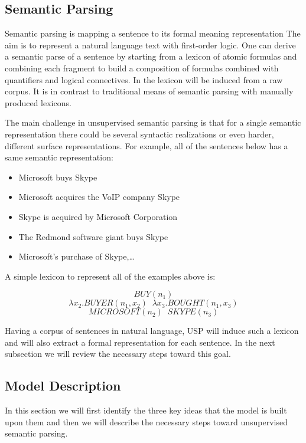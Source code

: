 \documentclass[12pt]{report}
\begin{document}
\subsection{Semantic Parsing}
\label{ch:definition}

Semantic parsing is mapping a sentence to its formal meaning representation \cite{Poon2009}
The aim is to represent a natural language text with first-order logic. One can derive a semantic parse of a sentence
by starting from a lexicon of atomic formulas and combining each fragment to build a composition of 
formulas combined with quantifiers and logical connectives. In \cite{Poon2009} 
the lexicon will be induced from a raw corpus. It is in contrast to traditional means of semantic parsing with manually
  produced lexicons.
  
  The main challenge in unsupervised semantic parsing is that for a single semantic representation there could be
  several syntactic realizations or even harder, different surface representations. For example, all of the
   sentences below has a same semantic representation:
   \begin{itemize}
     \item Microsoft buys Skype
     \item Microsoft acquires the VoIP company Skype
     \item Skype is acquired by Microsoft Corporation
     \item The Redmond software giant buys Skype
     \item Microsoft’s purchase of Skype,\ldots
   \end{itemize}  
  
   A simple lexicon to represent all of the examples above is:
  
   $$ BUY(n_1)$$
   $$ \lambda x_2.BUYER(n_1 , x_2) \; \;  \lambda x_3.BOUGHT(n_1 , x_3) $$
   $$ MICROSOFT(n_2) \; \; SKYPE(n_3)$$
   
   Having a corpus of sentences in natural language, USP \cite{Poon2009}
    will induce such a lexicon and will also extract a formal representation for each sentence. In the next 
    subsection we will review the necessary steps toward this goal.
\subsection{Model Description}
\label{ch:model}
In this section we will first identify the three key ideas that the model is built upon them and then 
we will describe the necessary steps toward unsupervised semantic parsing.
\end{document}
